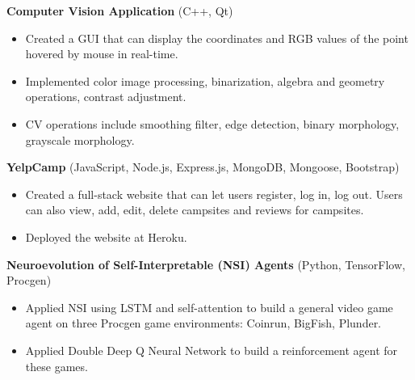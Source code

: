 \documentclass{article}
\begin{document}
\vspace{1em}

\textbf{Computer Vision Application} (C++, Qt)

\begin{itemize}[nosep]
	\item Created a GUI that can display the coordinates and RGB values of the point hovered by mouse in real-time.
	\item Implemented color image processing, binarization, algebra and geometry operations, contrast adjustment.
	\item CV operations include smoothing filter, edge detection, binary morphology,
	grayscale morphology.
\end{itemize}

\vspace{1em}

\textbf{YelpCamp} (JavaScript, Node.js, Express.js, MongoDB, Mongoose, Bootstrap)

\begin{itemize}[nosep]
	\item Created a full-stack website that can let users register, log in, log out. Users can also view, add, edit, delete
	campsites and reviews for campsites.
	\item Deployed the website at Heroku.
\end{itemize}

\vspace{1em}

\textbf{Neuroevolution of Self-Interpretable (NSI) Agents} (Python, TensorFlow, Procgen)

\begin{itemize}[nosep]
	\item Applied NSI using LSTM and self-attention to build a general video game agent on three Procgen game environments: Coinrun, BigFish, Plunder.
	\item Applied Double Deep Q Neural Network to build a reinforcement agent for these games.
\end{itemize}
\end{document}
